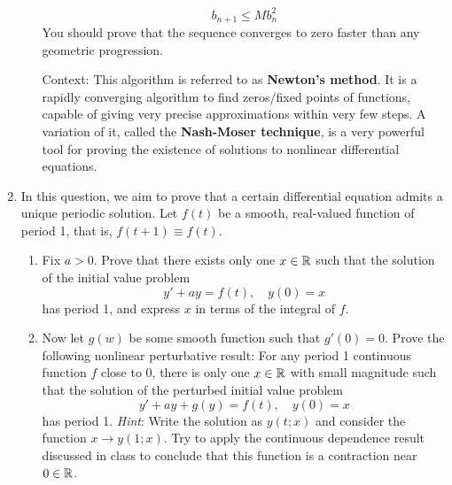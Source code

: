 \documentclass[../psets.tex]{subfiles}
\begin{document}
\begin{enumerate}
\begin{enumerate}
        \begin{equation*}
            b_{n+1} \leq Mb_n^2
        \end{equation*}
        You should prove that the sequence converges to zero faster than any geometric progression.\par
        Context: This algorithm is referred to as \textbf{Newton's method}. It is a rapidly converging algorithm to find zeros/fixed points of functions, capable of giving very precise approximations within very few steps. A variation of it, called the \textbf{Nash-Moser technique}, is a very powerful tool for proving the existence of solutions to nonlinear differential equations.
    \end{enumerate}
    \item In this question, we aim to prove that a certain differential equation admits a unique periodic solution. Let $f(t)$ be a smooth, real-valued function of period 1, that is, $f(t+1)\equiv f(t)$.
    \begin{enumerate}
        \item Fix $a>0$. Prove that there exists only one $x\in\mathbb{R}$ such that the solution of the initial value problem
        \begin{equation*}
            y'+ay = f(t)
            ,\quad
            y(0) = x
        \end{equation*}
        has period 1, and express $x$ in terms of the integral of $f$.
        \item Now let $g(w)$ be some smooth function such that $g'(0)=0$. Prove the following nonlinear perturbative result: For any period 1 continuous function $f$ close to 0, there is only one $x\in\mathbb{R}$ with small magnitude such that the solution of the perturbed initial value problem
        \begin{equation*}
            y'+ay+g(y) = f(t)
            ,\quad
            y(0) = x
        \end{equation*}
        has period 1. \emph{Hint}: Write the solution as $y(t;x)$ and consider the function $x\to y(1;x)$. Try to apply the continuous dependence result discussed in class to conclude that this function is a contraction near $0\in\mathbb{R}$.
    \end{enumerate}
\end{enumerate}
\end{document}
